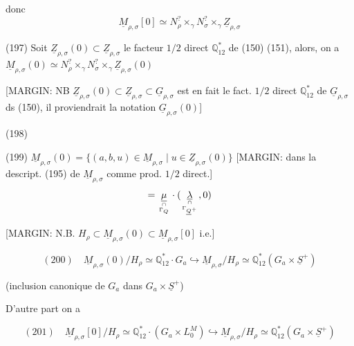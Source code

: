 donc
$$ \underline{M}_{\rho, \sigma}[0] \simeq N_\rho^? \times_\gamma N_\sigma^? \times_\gamma \underline{Z}_{\rho, \sigma} $$

(197) Soit $\underline{Z}_{\rho, \sigma}(0) \subset \underline{Z}_{\rho, \sigma}$
le facteur $1/2$ direct $\mathbb{Q}_{12}^*$ de (150) (151),
alors, on a $\underline{M}_{\rho, \sigma}(0) \simeq N_\rho^? \times_\gamma N_\sigma^? \times_\gamma \underline{Z}_{\rho, \sigma}(0)$

[MARGIN: NB $\underline{Z}_{\rho, \sigma}(0) \subset \underline{Z}_{\rho, \sigma} \subset \underline{G}_{\rho, \sigma}$ est en fait le fact. $1/2$ direct $\mathbb{Q}_{12}^*$ de $\underline{G}_{\rho, \sigma}$ ds (150), il proviendrait la notation $\underline{G}_{\rho, \sigma}(0)$]

(198)

(199) $\underline{M}_{\rho, \sigma}(0) = \{(a, b, u) \in \underline{M}_{\rho, \sigma} \mid u \in \underline{Z}_{\rho, \sigma}(0)\}$
[MARGIN: dans la descript. (195) de $\underline{M}_{\rho, \sigma}$ comme prod. $1/2$ direct.]
$$ = \underset{\cap \atop \Gamma_Q}{\underline{\mu}} \cdot ( \underset{\cap \atop \Gamma_{\underline{Q}^+}}{\underline{\lambda}} , 0 ) $$

\newpage


[MARGIN: N.B. $H_\rho \subset \underline{M}_{\rho, \sigma}(0) \subset \underline{M}_{\rho, \sigma}[0]$ i.e.]

$$ (200) \quad \underline{M}_{\rho, \sigma}(0) / H_\rho \simeq \mathbb{Q}_{12}^* \cdot G_a \hookrightarrow \underline{M}_{\rho, \sigma} / H_\rho \simeq \mathbb{Q}_{12}^* (G_a \times \underline{S}^+) $$

(inclusion canonique de $G_a$ dans $G_a \times \underline{S}^+$)

D'autre part on a

$$ (201) \quad \underline{M}_{\rho, \sigma}[0] / H_\rho \simeq \mathbb{Q}_{12}^* \cdot (G_a \times L_0^M) \hookrightarrow \underline{M}_{\rho, \sigma} / H_\rho \simeq \mathbb{Q}_{12}^* (G_a \times \underline{S}^+) $$

